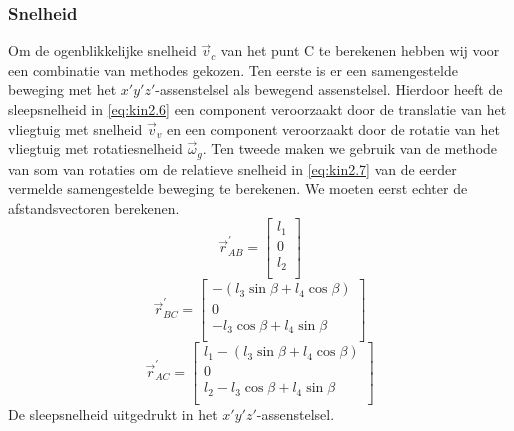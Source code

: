 \subsubsection{Snelheid}
Om de ogenblikkelijke snelheid $\vec{v}_{c}$ van het punt C te berekenen hebben wij voor een combinatie van methodes gekozen. Ten eerste is er een samengestelde beweging met het $x'y'z'$-assenstelsel als bewegend assenstelsel. Hierdoor heeft de sleepsnelheid in \eqref{eq:kin2.6} een component veroorzaakt door de translatie van het vliegtuig met snelheid $\vec{v}_{v}$ en een component veroorzaakt door de rotatie van het vliegtuig met rotatiesnelheid $\vec{\omega}_{g}$. Ten tweede maken we gebruik van de methode van som van rotaties om de relatieve snelheid in \eqref{eq:kin2.7} van de eerder vermelde samengestelde beweging te berekenen. We moeten eerst echter de afstandsvectoren berekenen.
\begin{equation}
\vec{r}_{AB}^{'}=
\begin{bmatrix}
l_{1}\\
0\\
l_{2}\\
\end{bmatrix}
\label{eq:kin2.3}
\end{equation}
\begin{equation}
\vec{r}_{BC}^{'}=
\begin{bmatrix}
-(l_{3}\sin{\beta}+l_{4}\cos{\beta})\\
0\\
-l_{3}\cos{\beta}+l_{4}\sin{\beta}\\
\end{bmatrix}
\label{eq:kin2.4}
\end{equation}
\begin{equation}
\vec{r}_{AC}^{'}=
\begin{bmatrix}
l_{1}-(l_{3}\sin{\beta}+l_{4}\cos{\beta})\\
0\\
l_{2}-l_{3}\cos{\beta}+l_{4}\sin{\beta}\\
\end{bmatrix}
\label{eq:kin2.5}
\end{equation}
De sleepsnelheid uitgedrukt in het $x'y'z'$-assenstelsel.
